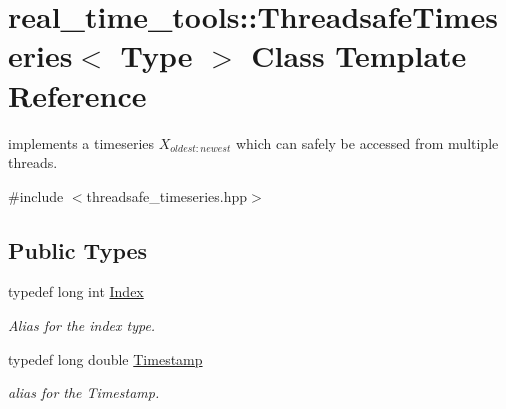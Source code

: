 \hypertarget{classreal__time__tools_1_1ThreadsafeTimeseries}{}\section{real\+\_\+time\+\_\+tools\+:\+:Threadsafe\+Timeseries$<$ Type $>$ Class Template Reference}
\label{classreal__time__tools_1_1ThreadsafeTimeseries}


implements a timeseries $ X_{{oldest}:{newest}} $ which can safely be accessed from multiple threads.  




{\ttfamily \#include $<$threadsafe\+\_\+timeseries.\+hpp$>$}

\subsection*{Public Types}
\begin{DoxyCompactItemize}
\item 
typedef long int \hyperlink{classreal__time__tools_1_1ThreadsafeTimeseries_a9364696c534468d7ad927883b16ca981}{Index}\hypertarget{classreal__time__tools_1_1ThreadsafeTimeseries_a9364696c534468d7ad927883b16ca981}{}\label{classreal__time__tools_1_1ThreadsafeTimeseries_a9364696c534468d7ad927883b16ca981}

\begin{DoxyCompactList}\small\item\em Alias for the index type. \end{DoxyCompactList}\item 
typedef long double \hyperlink{classreal__time__tools_1_1ThreadsafeTimeseries_a41e36f99889a580ce56491e573fa77b0}{Timestamp}\hypertarget{classreal__time__tools_1_1ThreadsafeTimeseries_a41e36f99889a580ce56491e573fa77b0}{}\label{classreal__time__tools_1_1ThreadsafeTimeseries_a41e36f99889a580ce56491e573fa77b0}

\begin{DoxyCompactList}\small\item\em alias for the Timestamp. \end{DoxyCompactList}\end{DoxyCompactItemize}
